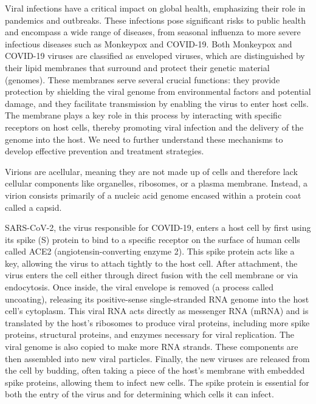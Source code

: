\documentclass[12pt]{article}
\begin{document}
\begin{flushleft}
Viral infections have a critical impact on global health, emphasizing their role in pandemics and outbreaks. These infections pose significant risks to public health and encompass a wide range of diseases, from seasonal influenza to more severe infectious diseases such as Monkeypox and COVID-19. Both Monkeypox and COVID-19 viruses are classified as enveloped viruses, which are distinguished by their lipid membranes that surround and protect their genetic material (genomes). These membranes serve several crucial functions: they provide protection by shielding the viral genome from environmental factors and potential damage, and they facilitate transmission by enabling the virus to enter host cells. The membrane plays a key role in this process by interacting with specific receptors on host cells, thereby promoting viral infection and the delivery of the genome into the host. We need to further understand these mechanisms to develop effective prevention and treatment strategies.

Virions are acellular, meaning they are not made up of cells and therefore lack cellular components like organelles, ribosomes, or a plasma membrane. Instead, a virion consists primarily of a nucleic acid genome encased within a protein coat called a capsid. 




SARS-CoV-2, the virus responsible for COVID-19, enters a host cell by first using its spike (S) protein to bind to a specific receptor on the surface of human cells called ACE2 (angiotensin-converting enzyme 2). This spike protein acts like a key, allowing the virus to attach tightly to the host cell. After attachment, the virus enters the cell either through direct fusion with the cell membrane or via endocytosis. Once inside, the viral envelope is removed (a process called uncoating), releasing its positive-sense single-stranded RNA genome into the host cell’s cytoplasm. This viral RNA acts directly as messenger RNA (mRNA) and is translated by the host's ribosomes to produce viral proteins, including more spike proteins, structural proteins, and enzymes necessary for viral replication. The viral genome is also copied to make more RNA strands. These components are then assembled into new viral particles. Finally, the new viruses are released from the cell by budding, often taking a piece of the host’s membrane with embedded spike proteins, allowing them to infect new cells. The spike protein is essential for both the entry of the virus and for determining which cells it can infect.


\end{flushleft}
\end{document}
